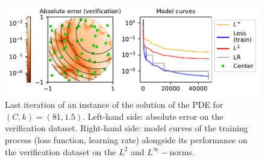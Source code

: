 \documentclass[12pt]{report} %
\begin{document}
\begin{figure}[h]
  \includegraphics[width=\textwidth]{imagenes/experiments/2d/pde_parabola/parabola-TR15-C81-19-E47449.pdf}
  \caption{Last iteration of an instance of the solution of the PDE for $(C,k)=(81,1.5)$. Left-hand side: absolute error on the verification dataset. Right-hand side: model curves of the training process (loss function, learning rate) alongside its performance on the verification dataset on the $L^2$ and $L^\infty-$norms.}
  \label{fig:2d-pde-usual-result}
\end{figure}
\end{document}
